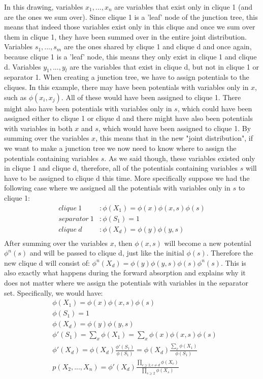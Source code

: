 \documentclass[11pt,a4paper,oneside]{report}
\begin{document}
In this drawing, variables $x_1,...,x_n$ are variables that exist only in clique 1 (and are the ones we sum over). Since clique 1 is a 'leaf' node of the junction tree, this means that indeed those variables exist only in this clique and once we sum over them in clique 1, they have been summed over in the entire joint distribution. Variables $s_1,...,s_m$ are the ones shared by clique 1 and clique d and once again, because clique 1 is a 'leaf' node, this means they only exist in clique 1 and clique d. Variables $y_1,...,y_l$ are the variables that exist in clique d, but not in clique 1 or separator 1. When creating a junction tree, we have to assign potentials to the cliques. In this example, there may have been potentials with variables only in $x$, such as $\phi(x_i,x_j)$. All of these would have been assigned to clique 1. There might also have been potentials with variables only in $s$, which could have been assigned either to clique 1 or clique d and there might have also been potentials with variables 
in both $x$ and $s$, which would have been assigned to clique 1. By summing over the variables $x$, this means that in the new "joint distribution", if we want to make a junction tree we now need to know where to assign the potentials containing variables $s$. As we said though, these variables existed only in clique 1 and clique d, therefore, all of the potentials containing variables $s$ will have to be assigned to clique d this time. More specifically suppose we had the following case where we assigned all the potentials with variables only in $s$ to clique 1:
	\begin{align*}
	clique\ 1&:\phi(X_1) = \phi(x)\phi(x,s)\phi(s)\\
	separator\ 1&:\phi(S_1) = 1\\
	clique\ d&:\phi(X_d) = \phi(y)\phi(y,s)\\
	\end{align*}
	After summing over the variables $x$, then $\phi(x,s)$ will become a new potential $\phi^n(s)$ and will be passed to clique d, just like the initial $\phi(s)$. Therefore the new clique d will consist of: $\phi^n(X_d)=\phi(y)\phi(y,s)\phi(s)\phi^n(s)$. This is also exactly what happens during the forward absorption and explains why it does not matter where we assign the potentials with variables in the separator set. Specifically, we would have:
	\begin{align*}
	&\phi(X_1) = \phi(x)\phi(x,s)\phi(s)\\
	&\phi(S_1) = 1\\
	&\phi(X_d) = \phi(y)\phi(y,s)\\
	&\phi'(S_1) = \sum_{x}\phi(X_1)=\sum_{x}\phi(x)\phi(x,s)\phi(s)\\
	&\phi'(X_d) = \phi(X_d)\frac{\phi'(S_1)}{\phi(S_1)}=\phi(X_d)\frac{\sum_{x}\phi(X_1)}{\phi(S_1)}\\
	&p(X_2,...,X_n)=\phi'(X_d)\frac{\prod_{c \geq 2,c\neq d}\phi(X_c)}{\prod_{s \geq 2}\phi(X_s)}
	\end{align*}	
\end{document}
